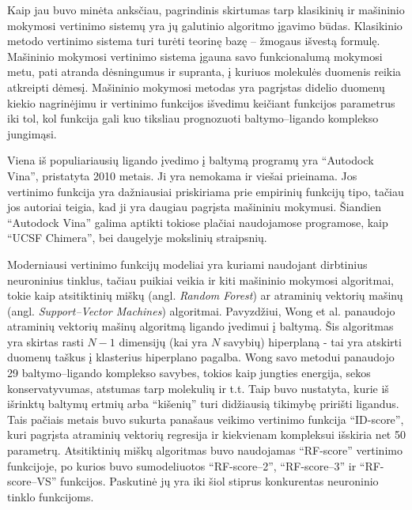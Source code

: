 Kaip jau buvo minėta anksčiau, pagrindinis skirtumas tarp klasikinių ir mašininio mokymosi vertinimo sistemų yra jų galutinio algoritmo įgavimo būdas. Klasikinio metodo vertinimo sistema turi turėti teorinę bazę -- žmogaus išvestą formulę. Mašininio mokymosi vertinimo sistema įgauna savo funkcionalumą mokymosi metu, pati atranda dėsningumus ir supranta, į kuriuos molekulės duomenis reikia atkreipti dėmesį. Mašininio mokymosi metodas yra pagrįstas didelio duomenų kiekio nagrinėjimu ir vertinimo funkcijos išvedimu keičiant funkcijos parametrus iki tol, kol funkcija gali kuo tiksliau prognozuoti baltymo--ligando komplekso jungimąsi. 

Viena iš populiariausių ligando įvedimo į baltymą programų yra \enquote{Autodock Vina}\cite{trott_autodock_2010}, pristatyta 2010 metais. Ji yra nemokama ir viešai prieinama. Jos vertinimo funkcija yra dažniausiai priskiriama prie empirinių funkcijų tipo, tačiau jos autoriai teigia, kad ji yra daugiau pagrįsta mašininiu mokymusi. Šiandien \enquote{Autodock Vina} galima aptikti tokiose plačiai naudojamose programose, kaip \enquote{UCSF Chimera}, bei daugelyje mokslinių straipsnių.

Moderniausi vertinimo funkcijų modeliai yra kuriami naudojant dirbtinius neuroninius tinklus, tačiau puikiai veikia ir kiti mašininio mokymosi algoritmai, tokie kaip atsitiktinių miškų (angl. \textit{Random Forest}) ar atraminių vektorių mašinų (angl. \textit{Support--Vector Machines}) algoritmai. Pavyzdžiui, Wong et al. \cite{wong_predicting_2013} panaudojo atraminių vektorių mašinų algoritmą ligando įvedimui į baltymą. Šis algoritmas yra skirtas rasti $N-1$ dimensijų (kai yra $N$ savybių) hiperplaną - tai yra atskirti duomenų taškus į klasterius hiperplano pagalba. Wong savo metodui panaudojo 29 baltymo--ligando komplekso savybes, tokios kaip jungties energija, sekos konservatyvumas, atstumas tarp molekulių ir t.t. Taip buvo nustatyta, kurie iš išrinktų baltymų ertmių arba \enquote{kišenių} turi didžiausią tikimybę pririšti ligandus. Tais pačiais metais buvo sukurta panašaus veikimo vertinimo funkcija \enquote{ID-score}, kuri pagrįsta atraminių vektorių regresija ir kiekvienam kompleksui išskiria net 50 parametrų.\cite{li_id-score_2013} Atsitiktinių miškų algoritmas buvo naudojamas \enquote{RF-score} vertinimo funkcijoje, po kurios buvo sumodeliuotos \enquote{RF-score--2}, \enquote{RF-score--3} ir \enquote{RF-score--VS} funkcijos. Paskutinė jų yra iki šiol stiprus konkurentas neuroninio tinklo funkcijoms.\cite{wojcikowski_performance_2017}

